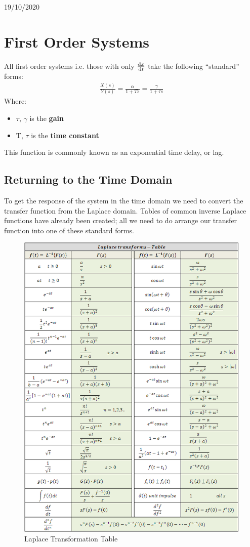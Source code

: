 \documentclass[class=report, crop=false, 12pt,a4paper]{standalone}
\begin{document}
\begin{center}
  19/10/2020
\end{center}
\section{First Order Systems}
All first order systems i.e. those with only $\frac{\dif x}{\dif t}$ take the following “standard” forms:
\begin{gather}
  \frac{X(s)}{Y(s)} = \frac{\alpha}{1+Ts} = \frac{\gamma}{1+\tau s}
\end{gather}
Where:
\begin{itemize}
  \item $\tau$, $\gamma$ is the \textbf{gain}
  \item T, $\tau$ is the \textbf{time constant}
\end{itemize}
This function is commonly known as an exponential time delay, or lag.
\subsection{Returning to the Time Domain}
To get the response of the system in the time domain we need to convert the transfer function from the Laplace domain. Tables of common inverse Laplace functions have already been created; all we need to do arrange our transfer function into one of these standard forms.
\begin{figure}[H]
  \centering
  \includegraphics[width = 1 \textwidth]{../img/laplacetransformationtable.png}
  \caption{Laplace Transformation Table}
\end{figure}
\end{document}
